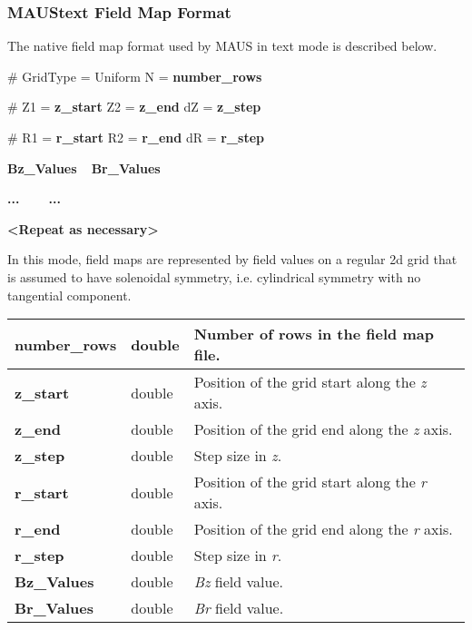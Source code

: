 \subsubsection{MAUStext Field Map Format}
The native field map format used by MAUS in text mode is described below.

{\ttfamily
\# GridType = Uniform N = \textbf{number\_rows}}

{\ttfamily
\# Z1 = \textbf{z\_start} Z2 = \textbf{z\_end} dZ = \textbf{z\_step}}

{\ttfamily
\# R1 = \textbf{r\_start} R2 = \textbf{r\_end} dR = \textbf{r\_step}}

{\ttfamily\bfseries
Bz\_Values\ \ Br\_Values}

{\ttfamily\bfseries
...\ \ \ \ ...}

{\ttfamily\bfseries
{\textless}Repeat as necessary{\textgreater}}

In this mode, field maps are represented by field values on a regular 2d grid that is assumed to have solenoidal
symmetry, i.e. cylindrical symmetry with no tangential component.

\begin{center}
\tabletail{}
\tablelasttail{}
\begin{supertabular}{|m{3cm}|m{2.305cm}|m{9.5cm}|}
\hline
{\ttfamily\bfseries number\_rows} &
double &
Number of rows in the field map file.\\\hline
{\ttfamily\bfseries z\_start} &
double &
Position of the grid start along the \textit{z} axis.\\\hline
{\ttfamily\bfseries z\_end} &
double &
Position of the grid end along the \textit{z} axis.\\\hline
{\ttfamily\bfseries z\_step} &
double &
Step size in \textit{z}.\\\hline
{\ttfamily\bfseries r\_start} &
double &
Position of the grid start along the \textit{r} axis.\\\hline
{\ttfamily\bfseries r\_end} &
double &
Position of the grid end along the \textit{r} axis.\\\hline
{\ttfamily\bfseries r\_step} &
double &
Step size in \textit{r}.\\\hline
{\ttfamily\bfseries Bz\_Values} &
double &
\textit{Bz} field value.\\\hline
{\ttfamily\bfseries Br\_Values} &
double &
\textit{Br} field value.\\\hline
\end{supertabular}
\end{center}

